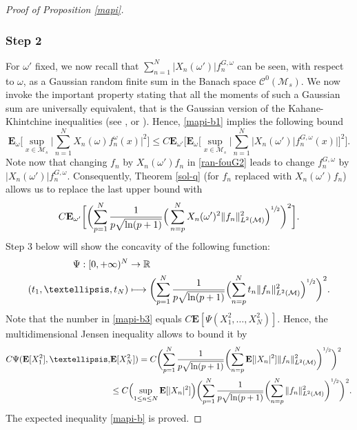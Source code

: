 \documentclass[11pt]{article}
\def\mto{\mathchoice{\longmapsto}{\mapsto}{\mapsto}{\mapsto}}
\theoremstyle{theorem}
\theoremstyle{definition}
\newcommand\R{\mathbb{R}}
\newcommand\E{\mathbf{E}}
\newcommand\CC{\mathcal{C}}
\begin{document}
\begin{proof}[Proof of Proposition \ref{mapi}]
\subsubsection*{Step 2}
For $\omega'$ fixed, we now recall that $\sum_{n=1}^N |X_n(\omega')| f_n^{G,\omega}$ can be seen, with respect to $\omega$, as a Gaussian random finite sum in the Banach space $\CC^0(\mathcal{M}_s)$.
We now invoke the important property stating that all the moments of such a Gaussian sum are universally equivalent, that is the Gaussian version of the Kahane-Khintchine inequalities (see \cite[Cor.\,3.2]{ledoux}, \cite[p.\,44]{pisier1981} or \cite[p.\,256, Cor.\,V.27]{queff1}).
Hence, \eqref{mapi-b1} implies the following bound
\begin{equation*}
\E_{\omega}\biggl[\sup_{x\in \mathcal{M}_s}\Big|\sum_{n=1}^N X_n(\omega)f_n^{\omega}(x)\Big|^{2} \biggr]\leq C\E_{\omega'}\biggl[\E_{\omega}\biggl[\sup_{x\in \mathcal{M}_s}\Big| \sum_{n=1}^N |X_n(\omega')| f_n^{G,\omega}(x) \Big| \biggr]^2 \biggr].
\end{equation*}
Note now that changing $f_n$ by $X_n(\omega')f_n$ in \eqref{ran-fouG2} leads to change $f_n^{G,\omega}$ by $|X_n(\omega')| f_n^{G,\omega}$.
Consequently, Theorem \ref{sol-q} (for $f_n$ replaced with $X_n(\omega')f_n$) allows us to replace the last upper bound with
\begin{equation}\label{mapi-b3}
C\E_{\omega'}\biggl[\biggl(\sum_{p=1}^N \frac{1}{p\sqrt{\ln(p+1)}}\Big(\sum_{n=p}^{N} X_n(\omega')^2\|f_n\|_{L^2(\mathcal{M})}^2 \Big)^{\sfrac{1}{2}}\biggr)^2\biggr].
\end{equation}
Step 3 below will show the concavity of the following function:
\begin{equation}\label{concav}
\begin{split}
\Psi: [0,+\infty)^N & \to\R \\
(t_1,\dots,t_N) & \mto \biggl(\sum_{p=1}^N \frac{1}{p\sqrt{\ln(p+1)}}\Bigl(\sum_{n=p}^{N} t_n \|f_n\|_{L^2(\mathcal{M})}^2 \Bigr)^{\sfrac{1}{2}}\biggr)^2.
\end{split}
\end{equation}
Note that the number in \eqref{mapi-b3} equals $C \E[\Psi(X_1^2,\dots,X_N^2)]$.
Hence, the multidimensional Jensen inequality allows to bound it by
\begin{align*}
C \Psi(\E[X_1^2],\dots,&\E[X_N^2])
=C\biggl(\sum_{p=1}^N \frac{1}{p\sqrt{\ln(p+1)}}\biggl(\sum_{n=p}^{N} \E[| X_n|^2]\|f_n\|_{L^2(\mathcal{M})}^2 \biggr)^{\sfrac{1}{2}}\biggr)^2\\
&\leq C \Bigl(\sup_{1\leq n\leq N} \E[|X_n|^2] \Bigr)
\biggl(\sum_{p=1}^N \frac{1}{p\sqrt{\ln(p+1)}}\biggl(\sum_{n=p}^{N} \|f_n\|_{L^2(\mathcal{M})}^2 \biggr)^{\sfrac{1}{2}}\biggr)^2.
\end{align*}
The expected inequality \eqref{mapi-b} is proved.


\end{proof}
\end{document}
